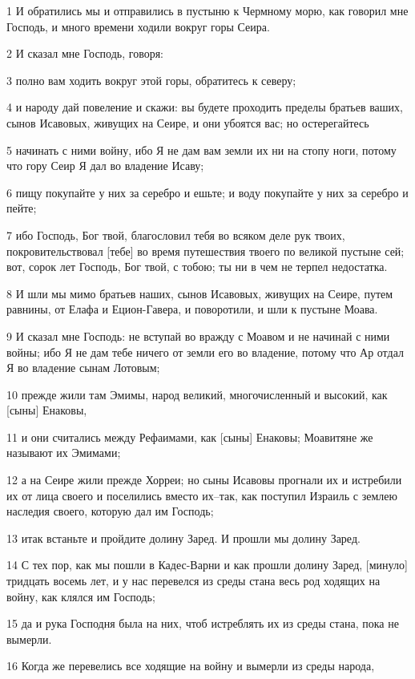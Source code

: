 \par 1 И обратились мы и отправились в пустыню к Чермному морю, как говорил мне Господь, и много времени ходили вокруг горы Сеира.
\par 2 И сказал мне Господь, говоря:
\par 3 полно вам ходить вокруг этой горы, обратитесь к северу;
\par 4 и народу дай повеление и скажи: вы будете проходить пределы братьев ваших, сынов Исавовых, живущих на Сеире, и они убоятся вас; но остерегайтесь
\par 5 начинать с ними войну, ибо Я не дам вам земли их ни на стопу ноги, потому что гору Сеир Я дал во владение Исаву;
\par 6 пищу покупайте у них за серебро и ешьте; и воду покупайте у них за серебро и пейте;
\par 7 ибо Господь, Бог твой, благословил тебя во всяком деле рук твоих, покровительствовал [тебе] во время путешествия твоего по великой пустыне сей; вот, сорок лет Господь, Бог твой, с тобою; ты ни в чем не терпел недостатка.
\par 8 И шли мы мимо братьев наших, сынов Исавовых, живущих на Сеире, путем равнины, от Елафа и Ецион-Гавера, и поворотили, и шли к пустыне Моава.
\par 9 И сказал мне Господь: не вступай во вражду с Моавом и не начинай с ними войны; ибо Я не дам тебе ничего от земли его во владение, потому что Ар отдал Я во владение сынам Лотовым;
\par 10 прежде жили там Эмимы, народ великий, многочисленный и высокий, как [сыны] Енаковы,
\par 11 и они считались между Рефаимами, как [сыны] Енаковы; Моавитяне же называют их Эмимами;
\par 12 а на Сеире жили прежде Хорреи; но сыны Исавовы прогнали их и истребили их от лица своего и поселились вместо их--так, как поступил Израиль с землею наследия своего, которую дал им Господь;
\par 13 итак встаньте и пройдите долину Заред. И прошли мы долину Заред.
\par 14 С тех пор, как мы пошли в Кадес-Варни и как прошли долину Заред, [минуло] тридцать восемь лет, и у нас перевелся из среды стана весь род ходящих на войну, как клялся им Господь;
\par 15 да и рука Господня была на них, чтоб истреблять их из среды стана, пока не вымерли.
\par 16 Когда же перевелись все ходящие на войну и вымерли из среды народа,
